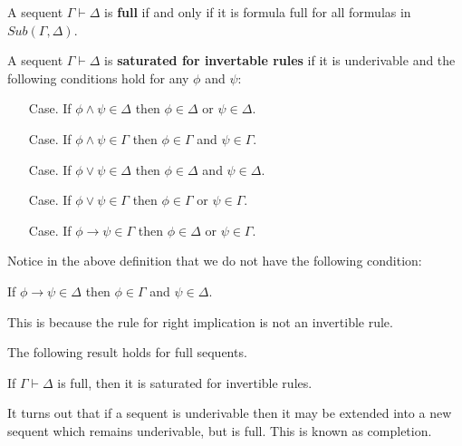 \documentclass{article}
\begin{document}
\begin{definition}
  \label{def:full_sequent}
  A sequent $\Gamma \vdash \Delta$ is \textbf{full} if and only if it is formula full for all formulas in 
  $Sub(\Gamma,\Delta)$.
\end{definition}

\begin{definition}
  \label{def:sat_for_invert_rules}
  A sequent $\Gamma \vdash \Delta$ is \textbf{saturated for invertable rules} if it is
  underivable and the following conditions hold for any $\phi$ and $\psi$:
    \begin{itemize}
    \item[Case.] If $\phi \land \psi \in \Delta$ then $\phi \in \Delta$ or $\psi \in \Delta$.
    \item[Case.] If $\phi \land \psi \in \Gamma$ then $\phi \in \Gamma$ and $\psi \in \Gamma$.
    \item[Case.] If $\phi \lor \psi \in \Delta$ then $\phi \in \Delta$ and $\psi \in \Delta$.
    \item[Case.] If $\phi \lor \psi \in \Gamma$ then $\phi \in \Gamma$ or $\psi \in \Gamma$.      
    \item[Case.] If $\phi \to \psi \in \Gamma$ then $\phi \in \Delta$ or $\psi \in \Gamma$.      
    \end{itemize}    
\end{definition}
\noindent
Notice in the above definition that we do not have the following condition:
\begin{center}
  If $\phi \to \psi \in \Delta$ then $\phi \in \Gamma$ and $\psi \in \Delta$.      
\end{center}
This is because the rule for right implication is not an invertible rule.  

\noindent
The following result holds for full sequents.
\begin{lemma}[Saturation]
  \label{lemma:saturation}
  If $\Gamma \vdash \Delta$ is full, then it is saturated for invertible rules.
\end{lemma}

It turns out that if a sequent is underivable then it may be extended into a new sequent
which remains underivable, but is full.  This is known as completion. 
\end{document}
